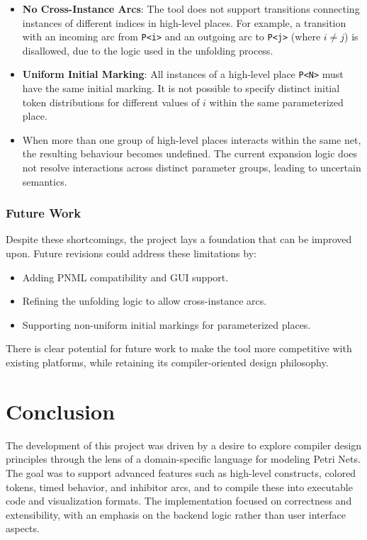 \documentclass[12pt]{article}
\begin{document}
            \begin{itemize}
                \item \textbf{No Cross-Instance Arcs}: The tool does not support transitions connecting instances of different indices in high-level places. For example, a transition with an incoming arc from \texttt{P<i>} and an outgoing arc to \texttt{P<j>} (where $i \ne j$) is disallowed, due to the logic used in the unfolding process.
                \item \textbf{Uniform Initial Marking}: All instances of a high-level place \texttt{P<N>} must have the same initial marking. It is not possible to specify distinct initial token distributions for different values of $i$ within the same parameterized place.
                \item When more than one group of high-level places interacts within the same net, the resulting behaviour becomes undefined. The current expansion logic does not resolve interactions across distinct parameter groups, leading to uncertain semantics.
            \end{itemize}

        \subsubsection{Future Work}

        Despite these shortcomings, the project lays a foundation that can be improved upon. Future revisions could address these limitations by:
        \begin{itemize}
            \item Adding PNML compatibility and GUI support.
            \item Refining the unfolding logic to allow cross-instance arcs.
            \item Supporting non-uniform initial markings for parameterized places.
        \end{itemize}

        There is clear potential for future work to make the tool more competitive with existing platforms, while retaining its compiler-oriented design philosophy.

        \section*{Conclusion}

The development of this project was driven by a desire to explore compiler design principles through the lens of a domain-specific language for modeling Petri Nets. The goal was to support advanced features such as high-level constructs, colored tokens, timed behavior, and inhibitor arcs, and to compile these into executable code and visualization formats. The implementation focused on correctness and extensibility, with an emphasis on the backend logic rather than user interface aspects.
\end{document}
